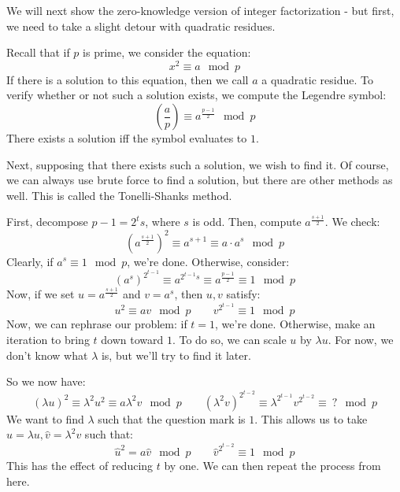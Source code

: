 \documentclass{article}
\begin{document}

We will next show the zero-knowledge version of integer factorization - but first,
we need to take a slight detour with quadratic residues.

Recall that if $ p $ is prime, we consider the equation:
\begin{equation*}
    x^{2} \equiv a \mod p
\end{equation*}
If there is a solution to this equation, then we call $ a $ a quadratic residue.
To verify whether or not such a solution exists, we compute the Legendre symbol:
\begin{equation*}
    \left( \frac{a}{p} \right) \equiv a^{\frac{p-1}{2}} \mod p
\end{equation*}
There exists a solution iff the symbol evaluates to $ 1 $.

Next, supposing that there exists such a solution, we wish to find it.
Of course, we can always use brute force to find a solution, but there are other methods as well.
This is called the Tonelli-Shanks method.

First, decompose $ p - 1 = 2^{t}s $, where $ s $ is odd.
Then, compute $ a^{\frac{s+1}{2}} $. We check:
\begin{equation*}
    \left( a^{\frac{s+1}{2}} \right)^{2} \equiv a^{s+1} \equiv a\cdot a^{s} \mod p
\end{equation*}
Clearly, if $ a^{s} \equiv 1 \mod p $, we're done. Otherwise, consider:
\begin{equation*}
    \left( a^{s} \right)^{2^{t-1}} \equiv a^{2^{t-1}s} \equiv a^{\frac{p-1}{2}} \equiv 1 \mod p
\end{equation*}
Now, if we set $ u = a^{\frac{s+1}{2}} $ and $ v = a^{s} $, then $ u, v $ satisfy:
\begin{equation*}
    u^{2} \equiv av \mod p \qquad v^{2^{t-1}} \equiv 1 \mod p
\end{equation*}
Now, we can rephrase our problem: if $ t = 1 $, we're done.
Otherwise, make an iteration to bring $ t $ down toward $ 1 $.
To do so, we can scale $ u $ by $ \lambda u $.
For now, we don't know what $ \lambda $ is, but we'll try to find it later.

So we now have:
\begin{equation*}
    (\lambda u)^{2} \equiv \lambda^{2}u^{2} \equiv a\lambda^{2}v \mod p \qquad
    (\lambda^{2}v)^{2^{t-2}} \equiv \lambda^{2^{t-1}}v^{2^{t-2}} \equiv \ ? \mod p
\end{equation*}
We want to find $ \lambda $ such that the question mark is $ 1 $.
This allows us to take $ \hat{u} = \lambda u, \hat{v} = \lambda^{2}v $ such that:
\begin{equation*}
    \hat u^{2} = a\hat v \mod p \qquad
    \hat v^{2^{t-2}} \equiv 1 \mod p
\end{equation*}
This has the effect of reducing $ t $ by one. We can then repeat the process from here.
\end{document}
